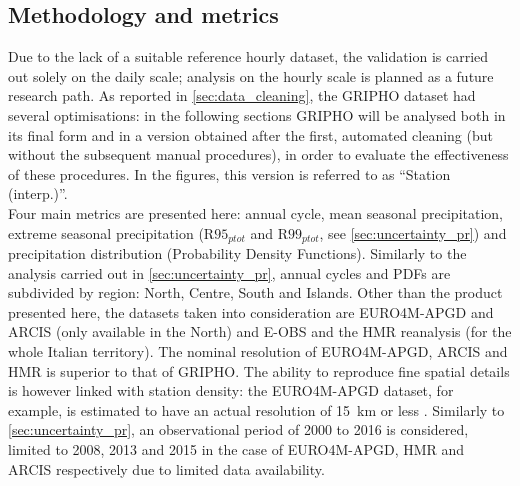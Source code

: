 \subsection{Methodology and metrics}
Due to the lack of a suitable reference hourly dataset, the validation is carried out solely on the daily scale; analysis on the hourly scale is planned as a future research path.
As reported in \cref{sec:data_cleaning}, the GRIPHO dataset had several optimisations: in the following sections GRIPHO will be analysed both in its final form and in a version obtained after the first, automated cleaning (but without the subsequent manual procedures), in order to evaluate the effectiveness of these procedures.
In the figures, this version is referred to as ``Station (interp.)''.\\
Four main metrics are presented here: annual cycle, mean seasonal precipitation, extreme seasonal precipitation ($\textrm{R95}_{ptot}$ and $\textrm{R99}_{ptot}$, see \cref{sec:uncertainty_pr}) and precipitation distribution (Probability Density Functions). Similarly to the analysis carried out in \cref{sec:uncertainty_pr}, annual cycles and PDFs are subdivided by region: North, Centre, South and Islands. Other than the product presented here, the datasets taken into consideration are EURO4M-APGD and ARCIS (only available in the North) and E-OBS and the HMR reanalysis (for the whole Italian territory). The nominal resolution of EURO4M-APGD, ARCIS and HMR is superior to that of GRIPHO. The ability to reproduce fine spatial details is however linked with station density: the EURO4M-APGD dataset, for example, is estimated to have an actual resolution of \SI{15}{\kilo\metre} or less \citep{Isotta2014}.
Similarly to \cref{sec:uncertainty_pr}, an observational period of 2000 to 2016 is considered, limited to 2008, 2013 and 2015 in the case of EURO4M-APGD, HMR and ARCIS respectively due to limited data availability.

